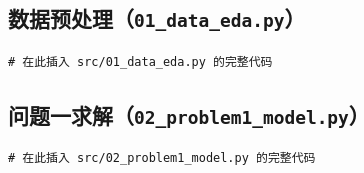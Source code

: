 \documentclass[12pt, a4paper]{article}
\begin{document}
\subsection{数据预处理（\texttt{01\_data\_eda.py}）}

\begin{lstlisting}[style=pythonstyle, caption={数据探索与预处理}]
# 在此插入 src/01_data_eda.py 的完整代码
\end{lstlisting}

\subsection{问题一求解（\texttt{02\_problem1\_model.py}）}

\begin{lstlisting}[style=pythonstyle, caption={问题一建模与求解}]
# 在此插入 src/02_problem1_model.py 的完整代码
\end{lstlisting}

\end{document}
